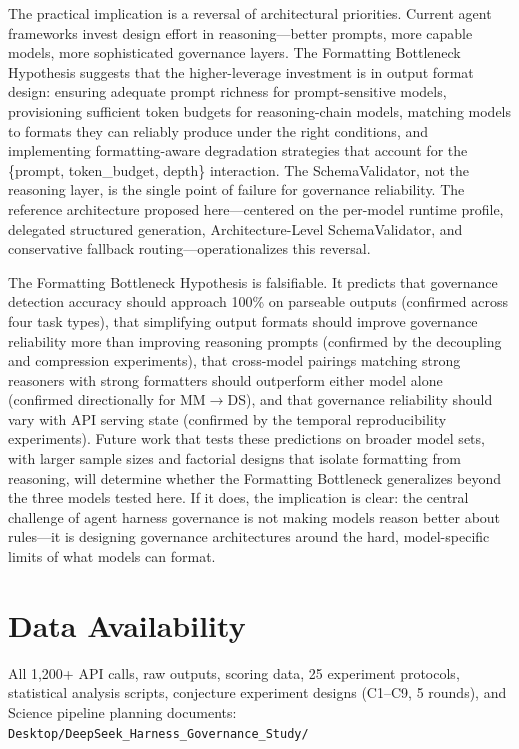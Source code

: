 \documentclass[11pt,a4paper]{article}
\begin{document}
The practical implication is a reversal of architectural priorities. Current agent frameworks invest design effort in reasoning---better prompts, more capable models, more sophisticated governance layers. The Formatting Bottleneck Hypothesis suggests that the higher-leverage investment is in output format design: ensuring adequate prompt richness for prompt-sensitive models, provisioning sufficient token budgets for reasoning-chain models, matching models to formats they can reliably produce under the right conditions, and implementing formatting-aware degradation strategies that account for the \{prompt, token\_budget, depth\} interaction. The SchemaValidator, not the reasoning layer, is the single point of failure for governance reliability. The reference architecture proposed here---centered on the per-model runtime profile, delegated structured generation, Architecture-Level SchemaValidator, and conservative fallback routing---operationalizes this reversal.

The Formatting Bottleneck Hypothesis is falsifiable. It predicts that governance detection accuracy should approach 100\% on parseable outputs (confirmed across four task types), that simplifying output formats should improve governance reliability more than improving reasoning prompts (confirmed by the decoupling and compression experiments), that cross-model pairings matching strong reasoners with strong formatters should outperform either model alone (confirmed directionally for MM$\rightarrow$DS), and that governance reliability should vary with API serving state (confirmed by the temporal reproducibility experiments). Future work that tests these predictions on broader model sets, with larger sample sizes and factorial designs that isolate formatting from reasoning, will determine whether the Formatting Bottleneck generalizes beyond the three models tested here. If it does, the implication is clear: the central challenge of agent harness governance is not making models reason better about rules---it is designing governance architectures around the hard, model-specific limits of what models can format.

\section*{Data Availability}

All 1,200+ API calls, raw outputs, scoring data, 25 experiment protocols, statistical analysis scripts, conjecture experiment designs (C1--C9, 5 rounds), and Science pipeline planning documents:\\
\texttt{Desktop/DeepSeek\_Harness\_Governance\_Study/}
\end{document}
